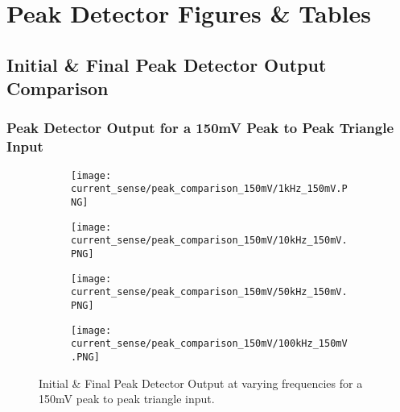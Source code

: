 \chapter{Peak Detector Figures \& Tables}\label{A:peak_detector}

\section*{Initial \& Final Peak Detector Output Comparison}\label{A:peak_detector_screenshots}

\subsection*{Peak Detector Output for a 150mV Peak to Peak Triangle Input}
\begin{figure}[H]
    
    \centering
    \begin{subfigure}{0.45\textwidth}
        \texttt{[image: current\_sense/peak\_comparison\_150mV/1kHz\_150mV.PNG]}
    \end{subfigure}
    \begin{subfigure}{0.45\textwidth}
        \texttt{[image: current\_sense/peak\_comparison\_150mV/10kHz\_150mV.PNG]}
    \end{subfigure}
    \begin{subfigure}{0.45\textwidth}
        \texttt{[image: current\_sense/peak\_comparison\_150mV/50kHz\_150mV.PNG]}
    \end{subfigure}
    \begin{subfigure}{0.45\textwidth}
        \texttt{[image: current\_sense/peak\_comparison\_150mV/100kHz\_150mV.PNG]}
    \end{subfigure}
    \caption{Initial \& Final Peak Detector Output at varying frequencies for a 150mV peak to peak triangle input.}
\end{figure}


